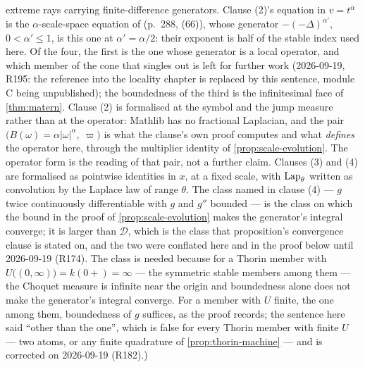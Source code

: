 \begin{proposition}
{extreme rays carrying finite-difference generators. Clause (2)'s equation in $v = t^\alpha$ is the
$\alpha$-scale-space equation of  (p.~288, (66)), whose generator
$-(-\Delta)^{\alpha'}$, $0 < \alpha' \le 1$, is this one at $\alpha' = \alpha/2$: their exponent
is half of the stable index used here. Of the four, the first is the one whose generator is a
local operator, and which member of the cone that singles out is left for further work
(2026-09-19, R195: the reference into the locality chapter is replaced by this sentence, module C
being unpublished);
the boundedness of the third is the infinitesimal
face of \ref{thm:matern}. Clause (2) is formalised at the symbol and the jump measure rather
than at the operator: Mathlib has no fractional Laplacian, and the pair
$\bigl(B(\omega) = \alpha|\omega|^\alpha,\ \varpi\bigr)$ is what the clause's own proof computes
and what \emph{defines} the operator here, through the multiplier identity of
\ref{prop:scale-evolution}. The operator form is the reading of that pair, not a further
claim. Clauses (3) and (4) are formalised as pointwise identities in $x$, at a fixed scale, with
$\operatorname{Lap}_\theta$ written as convolution by the Laplace law of range $\theta$. The class named in
clause (4) --- $g$ twice continuously differentiable with $g$ and $g''$ bounded --- is the class on
which the bound in the proof of \ref{prop:scale-evolution} makes the generator's integral converge;
it is larger than $\mathcal{D}$, which is the class that proposition's convergence clause is stated
on, and the two were conflated here and in the proof below until 2026-09-19 (R174). The class is
needed because for a Thorin member with $U\bigl((0,\infty)\bigr) = k(0{+}) = \infty$ --- the
symmetric stable members among them ---
the Choquet measure is infinite near the origin and boundedness alone does not make
the generator's integral converge. For a member with $U$ finite, the \Matern{} one among them,
boundedness of $g$ suffices, as the proof records; the sentence here said ``other than the
\Matern{} one'', which is false for every Thorin member with finite $U$ --- two atoms, or any
finite quadrature of \ref{prop:thorin-machine} --- and is corrected on 2026-09-19 (R182).)}
\end{proposition}

